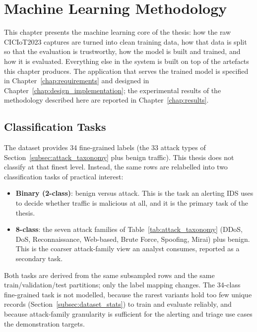 \chapter{Machine Learning Methodology}
\label{chap:ml_methodology}

\par This chapter presents the machine learning core of the thesis: how the raw CICIoT2023 captures are turned into clean training data, how that data is split so that the evaluation is trustworthy, how the model is built and trained, and how it is evaluated. Everything else in the system is built on top of the artefacts this chapter produces. The application that serves the trained model is specified in Chapter~\ref{chap:requirements} and designed in Chapter~\ref{chap:design_implementation}; the experimental results of the methodology described here are reported in Chapter~\ref{chap:results}.

\section{Classification Tasks}
\label{sec:classification_tasks}

\par The dataset provides 34 fine-grained labels (the 33 attack types of Section~\ref{subsec:attack_taxonomy} plus benign traffic). This thesis does not classify at that finest level. Instead, the same rows are relabelled into two classification tasks of practical interest:

\begin{itemize}
    \item \textbf{Binary (2-class)}: benign versus attack. This is the task an alerting IDS uses to decide whether traffic is malicious at all, and it is the primary task of the thesis.
    \item \textbf{8-class}: the seven attack families of Table~\ref{tab:attack_taxonomy} (DDoS, DoS, Reconnaissance, Web-based, Brute Force, Spoofing, Mirai) plus benign. This is the coarser attack-family view an analyst consumes, reported as a secondary task.
\end{itemize}

\par Both tasks are derived from the same subsampled rows and the same train/validation/test partitions; only the label mapping changes. The 34-class fine-grained task is not modelled, because the rarest variants hold too few unique records (Section~\ref{subsec:dataset_stats}) to train and evaluate reliably, and because attack-family granularity is sufficient for the alerting and triage use cases the demonstration targets.

